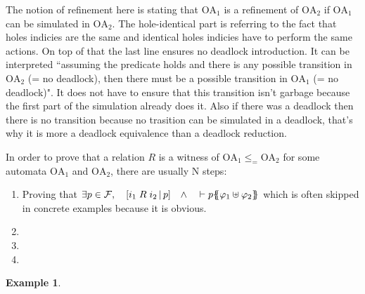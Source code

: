 \documentclass{article}
\theoremstyle{plain}
\theoremstyle{definition}
\newtheorem{exi}{Example}
\newcommand\mbrk[1]{{\left[#1\right]}}
\newcommand\mbrc[1]{{\left\{#1\right\}}}
\newcommand\psubst[1]{\mbrc{\!\!\mbrc{#1}\!\!}}
\newcommand\midbar{\,\middle|\,}
\newcommand\prel[4]{\mbrk{#2\mathrel{#1}#3\midbar #4}}
\newcommand\qwedge{\DOTSB\quad{\wedge}\quad}
\newcommand\fformulae[1]{{\mathcal{F}}}
\begin{document}
The notion of refinement here is stating that \(\mathrm{OA}_1\) is a refinement of \(\mathrm{OA}_2\) if \(\mathrm{OA}_1\) can be simulated in \(\mathrm{OA}_2\).
The hole-identical part is referring to the fact that holes indicies are the same and identical holes indicies have to perform the same actions.
On top of that the last line ensures no deadlock introduction.
It can be interpreted ``assuming the predicate holds and there is any possible transition in \(\mathrm{OA}_2\) (= no deadlock), then there must be a possible transition in \(\mathrm{OA}_1\) (= no deadlock)".
It does not have to ensure that this transition isn't garbage because the first part of the simulation already does it.
Also if there was a deadlock then there is no transition because no trasition can be simulated in a deadlock, that's why it is more a deadlock equivalence than a deadlock reduction.

In order to prove that a relation \(R\) is a witness of \(\mathrm{OA}_1 \leq_= \mathrm{OA}_2\) for some automata \(\mathrm{OA}_1\) and \(\mathrm{OA}_2\), there are usually N steps:
\begin{enumerate}
\item Proving that \(\exists p \in \fformulae{E}, \quad \prel{R}{i_1}{i_2}{p} \qwedge \vdash p\psubst{\varphi_1 \uplus \varphi_2}\) which is often skipped in concrete examples because it is obvious.
\item 
\item 
\item 
\end{enumerate}

\begin{exi} %
\end{exi}
\end{document}
